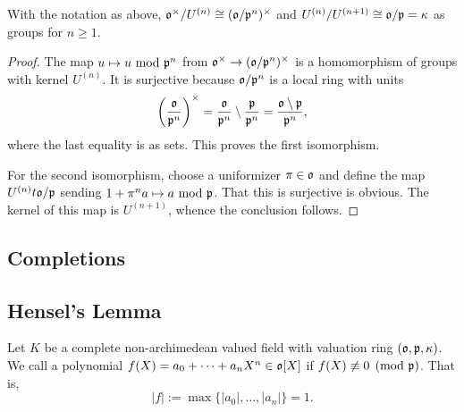 \begin{proposition}
    With the notation as above, $\mathfrak{o}^\times/U^{(n)}\cong(\mathfrak{o}/\mathfrak{p}^n)^\times$ and $U^{(n)}/U^{(n + 1)}\cong\mathfrak{o}/\mathfrak{p} = \kappa$ as groups for $n\ge 1$.
\end{proposition}
\begin{proof}
    The map $u\mapsto u~\mathrm{mod}~\mathfrak{p}^n$ from $\mathfrak{o}^\times\to(\mathfrak{o}/\mathfrak{p}^n)^\times$ is a homomorphism of groups with kernel $U^{(n)}$. It is surjective because $\mathfrak{o}/\mathfrak{p}^n$ is a local ring with units 
    \begin{equation*}
        \left(\frac{\mathfrak{o}}{\mathfrak{p}^n}\right)^\times = \frac{\mathfrak{o}}{\mathfrak{p}^n}\setminus\frac{\mathfrak{p}}{\mathfrak{p}^n} = \frac{\mathfrak{o}\setminus\mathfrak{p}}{\mathfrak{p}^n},
    \end{equation*}
    where the last equality is as sets. This proves the first isomorphism.

    For the second isomorphism, choose a uniformizer $\pi\in\mathfrak{o}$ and define the map $U^{(n)}t\mathfrak{o}/\mathfrak{p}$ sending $1 + \pi^n a\mapsto a~\mathrm{mod}~\mathfrak{p}$. That this is surjective is obvious. The kernel of this map is $U^{(n + 1)}$, whence the conclusion follows.
\end{proof}

\subsection{Completions}

\subsection{Hensel's Lemma}

\begin{definition}
    Let $K$ be a complete non-archimedean valued field with valuation ring $(\mathfrak{o},\mathfrak{p},\kappa)$. We call a polynomial $f(X) = a_0 + \cdots + a_nX^n\in\mathfrak{o}[X]$  if $f(X)\not\equiv0\pmod{\mathfrak{p}}$. That is, 
    \begin{equation*}
        |f| := \max\{|a_0|,\dots,|a_n|\} = 1.
    \end{equation*}
\end{definition}

